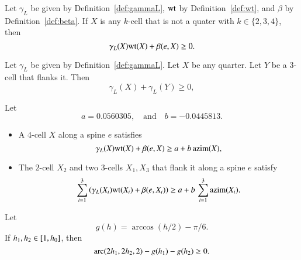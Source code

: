 \begin{calculation}\label{calc:cc:qtr}
Let $\gamma_L$ be given by Definition~\ref{def:gammaL}, ${\operatorname{wt}}$ by
Definition~\ref{def:wt}, and $\beta$ by Definition~\ref{def:beta}.
If $X$ is any $k$-cell that is not a quater with $k\in\{2,3,4\}$,
then %
\begin{displaymath}
\gamma_L(X) {\operatorname{wt}}(X) + \beta(e,X)\ge 0.
\end{displaymath} 
\end{calculation}

\begin{calculation}\label{calc:cc:2bl}
Let $\gamma_L$ be given by Definition~\ref{def:gammaL}.  Let $X$ be
any quarter.  Let $Y$ be a $3$-cell that flanks it.  Then
\begin{displaymath}
\gamma_L(X)+\gamma_L(Y)\ge 0,
\end{displaymath}
\end{calculation}

\begin{calculation}\label{calc:cc:5bl}
Let
\begin{displaymath}
a= 0.0560305, \quad\text{and}\quad  b= -0.0445813.
\end{displaymath}
\begin{itemize}
\item {} A $4$-cell $X$ along a spine $e$ satisfies
\begin{displaymath}
\gamma_L(X){\operatorname{wt}}(X) + \beta(e,X) \ge a + b\,{\operatorname{azim}}(X),
\end{displaymath}
\item {} The $2$-cell $X_2$ and two $3$-cells $X_1,X_3$
that flank it along a spine $e$ satisfy
\begin{displaymath}
\sum_{i=1}^3 \left(\gamma_L(X_i){\operatorname{wt}}(X_i) + \beta(e,X_i)\right)\ge a + b\,\sum_{i=1}^3{\operatorname{azim}}(X_i).
\end{displaymath}
\end{itemize}
\end{calculation}

\begin{calculation}\label{calc:cc:disks} 
Let
\begin{displaymath}
g(h) = \arccos(h/2) - \pi/6.
\end{displaymath}
If $h_1,h_2\in [1,{h_0}]$, then
\begin{displaymath}
{\operatorname{arc}}(2h_1,2h_2,2) - g(h_1) - g(h_2)\ge 0.
\end{displaymath}
\end{calculation}

